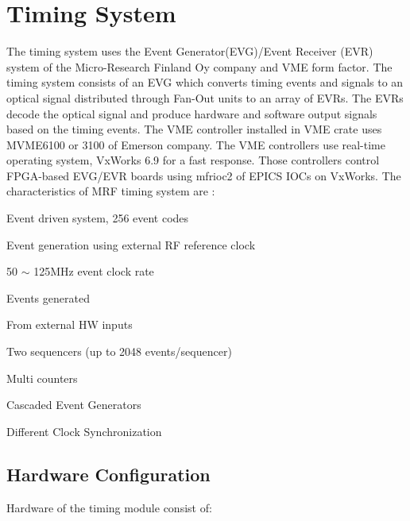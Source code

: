\documentclass[a4paper,
              ]{jacow}
\begin{document}
\section{Timing System}
The timing system uses the Event Generator(EVG)/Event Receiver (EVR) system of the Micro-Research Finland Oy company and VME form factor. The timing system\cite{mrf} consists of an EVG which converts timing events and signals to an optical signal distributed through Fan-Out units to an array of EVRs. The EVRs decode the optical signal and produce hardware and software output signals based on the timing events. The VME controller installed in VME crate uses MVME6100 or 3100 of Emerson company. The VME controllers use real-time operating system, VxWorks 6.9 for a fast response. Those controllers control FPGA-based EVG/EVR boards using mfrioc2 of EPICS IOCs on VxWorks.
\hfil\break
The characteristics of MRF timing system are :
\begin{Itemize}
	\item Event driven system, 256 event codes
	\item Event generation using external RF reference clock
	\item 50 $\sim$  125MHz event clock rate
	\item Events generated
	\begin{Itemize}
		\item From external HW inputs
		\item Two sequencers (up to 2048 events/sequencer)
		\item Multi counters
	\end{Itemize}
	\item Cascaded Event Generators
	\item Different Clock Synchronization
\end{Itemize}

\subsection{Hardware Configuration}

Hardware of the timing module consist of:
\end{document}

